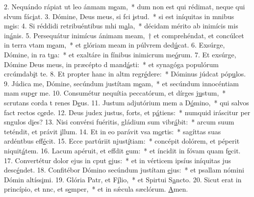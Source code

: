 2. Nequándo rápiat ut leo ánmam m\uline{e}am,~* dum non est qui rédimat, neque qui slvum fác\uline{i}at.
3. Dómine, Deus meus, si fci \uline{i}stud.~* si est iníquitas in mnibus m\uline{e}is:
4. Si réddidi retribuéntibus mhi m\uline{a}la,~* décidam mérito ab inimícis mis in\uline{á}nis.
5. Persequátur inimícus ánimam meam,~† et comprehéndat, et concúlcet in terra vtam m\uline{e}am,~* et glóriam meam in púlvrem ded\uline{ú}cat.
6. Exsúrge, Dómine, in ra t\uline{u}a:~* et exaltáre in fínibus inimicrum me\uline{ó}rum.
7. Et exsúrge, Dómine Deus meus, in præcépto d mand\uline{á}sti:~* et synagóga populórum crcúmdab\uline{i}t te.
8. Et propter hanc in altm regr\uline{é}dere:~* Dóminus júdcat póp\uline{u}los.
9. Júdica me, Dómine, secúndum justítam m\uline{e}am,~* et secúndum innocéntiam mam sup\uline{e}r me.
10. Consumétur nequítia peccatórum, et dírges j\uline{u}stum,~* scrutans corda t renes D\uline{e}us.
11. Justum adjutórium mem a D\uline{ó}mino,~* qui salvos fact rectos c\uline{o}rde.
12. Deus judex justus, forts, et p\uline{á}tiens:~* numquid iráscitur per sngulos d\uline{i}es?
13. Nisi convérsi fuéritis, gládium sum vibr\uline{á}bit:~* arcum suum teténdit, et právit \uline{i}llum.
14. Et in eo parávit vsa m\uline{o}rtis:~* sagíttas suas ardéntbus eff\uline{é}cit.
15. Ecce partúriit njust\uline{í}tiam:~* concépit dolórem, et péperit niquit\uline{á}tem.
16. Lacum apéruit, et effdit \uline{e}um:~* et íncidit in fóvam quam f\uline{e}cit.
17. Convertétur dolor ejus in cput \uline{e}jus:~* et in vérticem ipsíus iníquitas jus desc\uline{é}ndet.
18. Confitébor Dómino secúndum justítam \uline{e}jus:~* et psallam nómini Dómin altíss\uline{i}mi.
19. Glória Patr, et F\uline{í}lio,~* et Spirtui S\uline{a}ncto.
20. Sicut erat in princípio, et nnc, et s\uline{e}mper,~* et in sǽcula sæclórum. \uline{A}men.

